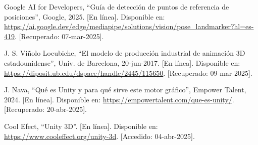 \begin{thebibliography}{99}
    Google AI for Developers, “Guía de detección de puntos de referencia de posiciones”, Google, 2025. [En línea]. Disponible en: \url{https://ai.google.dev/edge/mediapipe/solutions/vision/pose_landmarker?hl=es-419}. [Recuperado: 07-mar-2025].

    J. S. Viñolo Locubiche, “El modelo de producción industrial de animación 3D estadounidense”, Univ. de Barcelona, 20-jun-2017. [En línea]. Disponible en: \url{https://diposit.ub.edu/dspace/handle/2445/115650}. [Recuperado: 09-mar-2025].

    J. Nava, “Qué es Unity y para qué sirve este motor gráfico”, Empower Talent, 2024. [En línea]. Disponible en: \url{https://empowertalent.com/que-es-unity/}. [Recuperado: 20-abr-2025].

    Cool Efect, “Unity 3D”. [En línea]. Disponible en: \url{https://www.cooleffect.org/unity-3d}. [Accedido: 04-abr-2025].
\end{thebibliography}